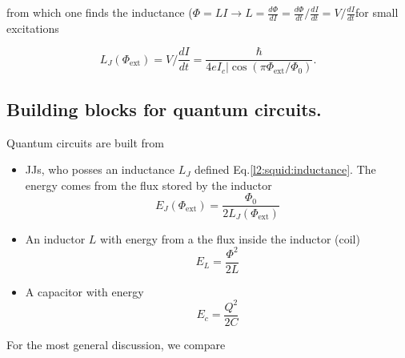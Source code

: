     \noindent     from    which     one     finds    the     inductance
    ($\Phi = LI \rightarrow L = \frac{d\Phi}{dI} = \frac{d\Phi}{dt}/\frac{dI}{dt}
    = V/\frac{dI}{dt}$for small excitations

    \begin{equation}
      L_J(\Phi_\text{ext}) = V/\frac{dI}{dt} = \frac{\hbar}{4eI_c|\cos(\pi\Phi_\text{ext}/\Phi_0)}.
    \end{equation}
    \vspace{6ex}

   \subsection{Building blocks for quantum circuits.}
   Quantum circuits are built from
   \begin{itemize}
   \item    JJs,   who    posses    an    inductance   $L_J$    defined
     Eq.\eqref{l2:squid:inductance}.   The energy  comes from  the flux
     stored by the inductor
     \begin{equation}
       E_J(\Phi_\text{ext}) = \frac{\Phi_0}{2L_J(\Phi_\text{ext})}
     \end{equation}
   \item  An inductor  $L$  with  energy from  a  the  flux inside  the
     inductor (coil)
     \begin{equation}
       E_L = \frac{\Phi^2}{2L}
     \end{equation}
   \item A capacitor with energy
     \begin{equation}
       E_c = \frac{Q^2}{2C}
     \end{equation}
   \end{itemize}

   For the most general discussion, we compare

